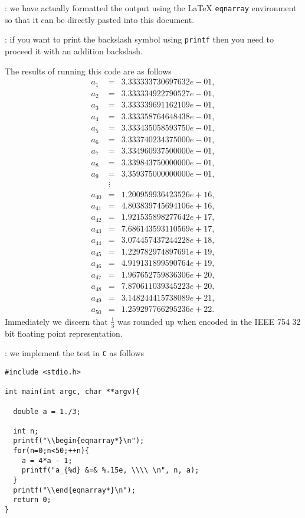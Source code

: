 : we have actually formatted the output using the \LaTeX{} \texttt{eqnarray} environment so that it can be directly pasted into this document.

: if you want to print the backslash symbol using \texttt{printf} then you need to proceed it with an addition backslash.

The results of running this code are as follows
\small
\begin{eqnarray*}
a_{1} &=& 3.333333730697632e-01, \\ 
a_{2} &=& 3.333334922790527e-01, \\ 
a_{3} &=& 3.333339691162109e-01, \\ 
a_{4} &=& 3.333358764648438e-01, \\ 
a_{5} &=& 3.333435058593750e-01, \\ 
a_{6} &=& 3.333740234375000e-01, \\ 
a_{7} &=& 3.334960937500000e-01, \\ 
a_{8} &=& 3.339843750000000e-01, \\ 
a_{9} &=& 3.359375000000000e-01, \\ 
 & \vdots & \\
a_{40} &=& 1.200959936423526e+16, \\ 
a_{41} &=& 4.803839745694106e+16, \\ 
a_{42} &=& 1.921535898277642e+17, \\ 
a_{43} &=& 7.686143593110569e+17, \\ 
a_{44} &=& 3.074457437244228e+18, \\ 
a_{45} &=& 1.229782974897691e+19, \\ 
a_{46} &=& 4.919131899590764e+19, \\ 
a_{47} &=& 1.967652759836306e+20, \\ 
a_{48} &=& 7.870611039345223e+20, \\ 
a_{49} &=& 3.148244415738089e+21, \\ 
a_{50} &=& 1.259297766295236e+22.
\end{eqnarray*}
\normalsize
Immediately we discern that $\frac13$ was rounded up when encoded in the IEEE 754 32 bit floating point representation.

\vspace{8pt}: we implement the test in \texttt{C} as follows

\begin{verbatim}
#include <stdio.h>

int main(int argc, char **argv){

  double a = 1./3;

  int n;
  printf("\\begin{eqnarray*}\n");
  for(n=0;n<50;++n){
    a = 4*a - 1;
    printf("a_{%d} &=& %.15e, \\\\ \n", n, a);
  }
  printf("\\end{eqnarray*}\n");
  return 0;
}
\end{verbatim}

